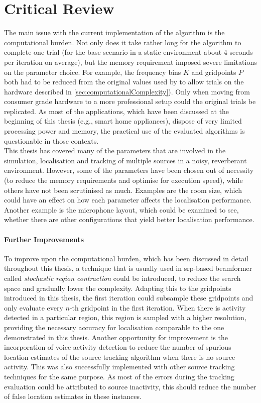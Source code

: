 \section{Critical Review}
\label{sec:critical-review}

The main issue with the current implementation of the algorithm is the computational burden. Not only does it take rather long for the algorithm to complete one trial (for the base scenario in a static environment about 4 seconds per iteration on average), but the memory requirement imposed severe limitations on the parameter choice. For example, the frequency bins $K$ and gridpoints $P$ both had to be reduced from the original values used by \cite{Schwartz2014} to allow trials on the hardware described in \ref{sec:computationalComplexity}). Only when moving from consumer grade hardware to a more professional setup could the original trials be replicated. As most of the applications, which have been discussed at the beginning of this thesis (e.g., smart home appliances), dispose of very limited processing power and memory, the practical use of the evaluated algorithms is questionable in those contexts.\\


This thesis has covered many of the parameters that are involved in the simulation, localisation and tracking of multiple sources in a noisy, reverberant environment. However, some of the parameters have been chosen out of necessity (to reduce the memory requirements and optimise for execution speed), while others have not been scrutinised as much. Examples are the room size, which could have an effect on how each parameter affects the localisation performance. Another example is the microphone layout, which could be examined to see, whether there are other configurations that yield better localisation performance.

\paragraph{Further Improvements}
To improve upon the computational burden, which has been discussed in detail throughout this thesis, a technique that is usually used in \gls{srp}-based beamformer called \emph{stochastic region contraction} could be introduced, to reduce the search space and gradually lower the complexity. Adapting this to the gridpoints introduced in this thesis, the first iteration could subsample these gridpoints and only evaluate every $n$-th gridpoint in the first iteration. When there is activity detected in a particular region, this region is sampled with a higher resolution, providing the necessary accuracy for localisation comparable to the one demonstrated in this thesis. Another opportunity for improvement is the incorporation of voice activity detection to reduce the number of spurious location estimates of the source tracking algorithm when there is no source activity. This was also successfully implemented with other source tracking techniques \cite{Lehmann2007} for the same purpose. As most of the errors during the tracking evaluation could be attributed to source inactivity, this should reduce the number of false location estimates in these instances.